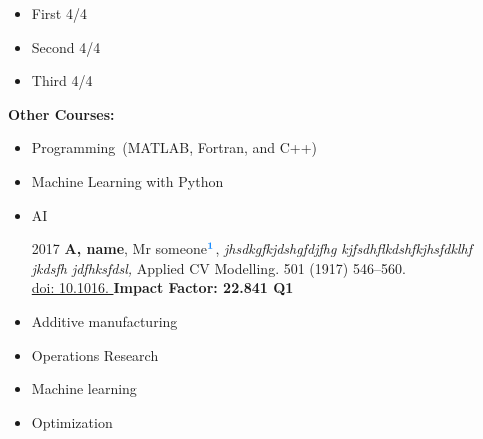 \documentclass[
	a4paper,
]{ThirtyNinesecondscv}
\begin{document}
\begin{multicols}{2}
	\begin{itemize}
		\item First 4/4
	  	\item Second 4/4
	  	\item Third 4/4
	 
	
       \end{itemize}
		\textbf{Other Courses:}
	{\footnotesize 	\begin{itemize}
		\item Programming~(MATLAB, Fortran, and C++)
	
	   	\item Machine Learning with Python
            \item AI

		\end{itemize}
			}	
\end{multicols}



\begin{itemize}
\item[2017] \textbf{A, name}, Mr someone$ ^{\textcolor[rgb]{0.00,0.50,1.00}{\textbf{1}}} $, \textit{jhsdkgfkjdshgfdjfhg kjfsdhflkdshfkjhsfdklhf jkdsfh jdfhksfdsl,} Applied CV Modelling. 501 (1917) 546–560. \\	\href{https://doi.org}{{\selectfont
 		\textcolor[rgb]{0.00,0.00,0.55}{doi: 10.1016. }}} \hfill \textbf{{\footnotesize Impact Factor: 22.841 Q1}}
 		


\end{itemize}


\begin{multicols}{2}
\begin{itemize}
 
 \item Additive manufacturing
  \item Operations Research
 \item Machine learning
  \item Optimization
\end{itemize}
\end{multicols}
\end{document}
